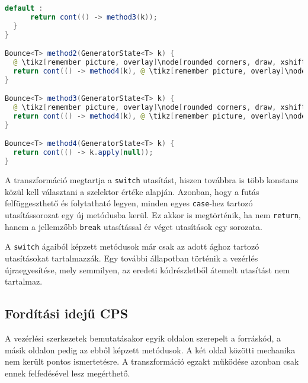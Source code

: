 \begin{center}
\begin{mdframed}[topline=true]
\begin{minipage}[t]{0.6\textwidth}
\begin{lstlisting}[language=Java, numbers=none, breaklines=true]
    default :
      return cont(() -> method3(k));
  }
}

Bounce<T> method2(GeneratorState<T> k) {
  @ \tikz[remember picture, overlay]\node[rounded corners, draw, xshift=-0.1cm, inner sep=5pt, anchor=west] {Kódrészlet \#1}; \vspace*{0.3cm} @
  return cont(() -> method4(k), @ \tikz[remember picture, overlay]\node[rounded corners, draw, xshift=-0.1cm, inner sep=5pt, anchor=west, yshift=0.1cm] {Kifejezés \#1}; \vspace*{0.2cm} \hspace*{1.75cm} @);
}

Bounce<T> method3(GeneratorState<T> k) {
  @ \tikz[remember picture, overlay]\node[rounded corners, draw, xshift=-0.1cm, inner sep=5pt, anchor=west] {Kódrészlet \#2}; \vspace*{0.3cm} @
  return cont(() -> method4(k), @ \tikz[remember picture, overlay]\node[rounded corners, draw, xshift=-0.1cm, inner sep=5pt, anchor=west, yshift=0.1cm] {Kifejezés \#2}; \vspace*{0.2cm} \hspace*{1.75cm} @);
}

Bounce<T> method4(GeneratorState<T> k) {
  return cont(() -> k.apply(null));
}
\end{lstlisting} 
\end{minipage}
\end{mdframed}
\end{center}

A transzformáció megtartja a \texttt{switch} utasítást, hiszen továbbra is több konstans közül kell választani a szelektor értéke alapján. Azonban, hogy a futás felfüggeszthető és folytatható legyen, minden egyes \texttt{case}-hez tartozó utasítássorozat egy új metódusba kerül. Ez akkor is megtörténik, ha nem \texttt{return}, hanem a jellemzőbb \texttt{break} utasítással ér véget utasítások egy sorozata.

A \texttt{switch} ágaiból képzett metódusok már csak az adott ághoz tartozó utasításokat tartalmazzák. Egy további állapotban történik a vezérlés újraegyesítése, mely semmilyen, az eredeti kódrészletből átemelt utasítást nem tartalmaz.

\subsection{Fordítási idejű CPS}

A vezérlési szerkezetek bemutatásakor egyik oldalon szerepelt a forráskód, a másik oldalon pedig az ebből képzett metódusok. A két oldal közötti mechanika nem került pontos ismertetésre. A transzformáció egzakt működése azonban csak ennek felfedésével lesz megérthető.

